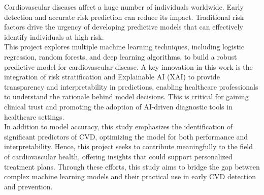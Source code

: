 Cardiovascular diseases affect a huge number of individuals worldwide. Early detection and accurate risk prediction can reduce its impact. Traditional risk factors drive the urgency of developing predictive models that can effectively identify individuals at high risk. \\
This project explores multiple machine learning techniques, including logistic regression, random forests, and deep learning algorithms, to build a robust predictive model for cardiovascular disease. A key innovation in this work is the integration of risk stratification and Explainable AI (XAI) to provide transparency and interpretability in predictions, enabling healthcare professionals to understand the rationale behind model decisions. This is critical for gaining clinical trust and promoting the adoption of AI-driven diagnostic tools in healthcare settings. \\
In addition to model accuracy, this study emphasizes the identification of significant predictors of CVD, optimizing the model for both performance and interpretability. Hence, this project seeks to contribute meaningfully to the field of cardiovascular health, offering insights that could support personalized treatment plans. Through these efforts, this study aims to bridge the gap between complex machine learning models and their practical use in early CVD detection and prevention.
